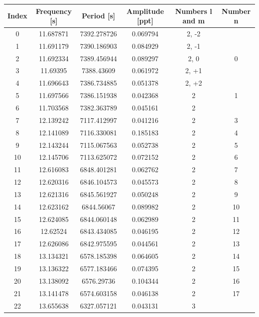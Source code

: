 \documentclass{aa}
\begin{document}
\begin{table}[b]
    \centering
    \begin{tabular}{c|c|c|c|c|c}
Index & Frequency [s] & Period [s] & Amplitude [ppt] & Numbers l and m & Number n \\ 
\hline 
0   &  11.687871 &  7392.278726 &  0.069794 &    2, -2  &   \\
1   &  11.691179 &  7390.186903 &  0.084929 &    2, -1  &   \\
2   &  11.692334 &  7389.456944 &  0.089297 &    2, 0  &  0 \\
3   &   11.69395 &   7388.43609 &  0.061972 &    2, +1  &   \\
4   &  11.696643 &  7386.734885 &  0.051378 &    2, +2  &      \\
5   &  11.697566 &  7386.151938 &  0.042368 &    2  &     1 \\
6   &  11.703568 &  7382.363789 &  0.045161 &    2  &         \\
7   &  12.139242 &  7117.412997 &  0.041216 &    2  &     3 \\
8  &  12.141089 &  7116.330081 &  0.185183 &    2  &      4 \\
9  &  12.143244 &  7115.067563 &  0.052738 &    2  &      5 \\
10  &  12.145706 &  7113.625072 &  0.072152 &    2  &     6 \\
11  &  12.616083 &  6848.401281 &  0.062762 &    2  &     7 \\
12  &  12.620316 &  6846.104573 &  0.045573 &    2  &     8 \\
13  &  12.621316 &  6845.561927 &  0.050248 &    2  &     9 \\
14  &  12.623162 &   6844.56067 &  0.089982 &    2  &     10  \\
15  &  12.624085 &  6844.060148 &  0.062989 &    2  &     11 \\
16  &   12.62524 &  6843.434085 &  0.046195 &    2  &     12 \\
17  &  12.626086 &  6842.975595 &  0.044561 &    2  &     13 \\
18  &  13.134321 &  6578.185398 &  0.064605 &    2  &     14 \\
19  &  13.136322 &  6577.183466 &  0.074395 &    2  &     15 \\
20  &  13.138092 &   6576.29736 &  0.104344 &    2  &     16 \\
21  &  13.141478 &  6574.603158 &  0.046138 &    2  &     17 \\
22  &  13.655638 &  6327.057121 &  0.043131 &    3  &         \\

\end{tabular}
\end{table}
\end{document}
